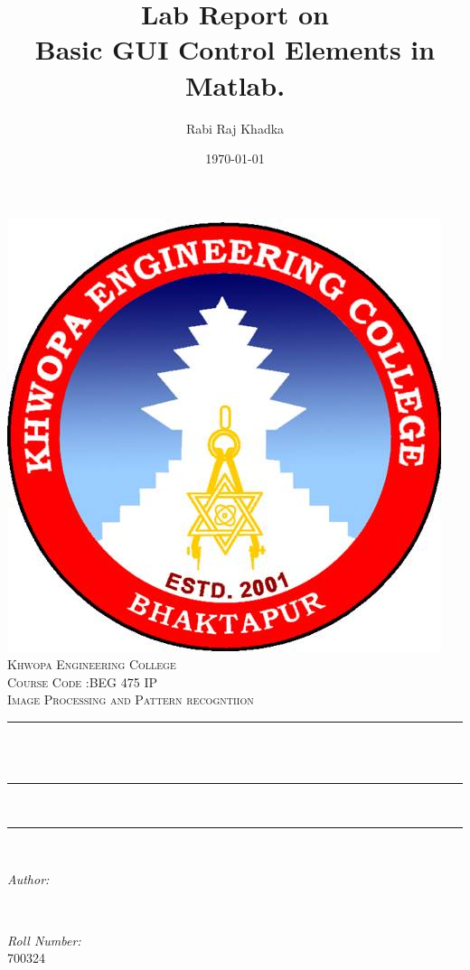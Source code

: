 \documentclass[12pt]{article}
\title{Lab Report on \\ Basic GUI Control Elements in Matlab.}								%
\author{Rabi Raj Khadka}								%
\date{\today}											%
\makeatletter
\let\thetitle\@title
\let\theauthor\@author
\let\thedate\@date
\makeatother
\begin{document}

\begin{titlepage}
	\centering
    \includegraphics[scale = 0.3]{kheclogo.jpg}\\[1.0 cm]	%
    \textsc{\LARGE Khwopa Engineering College}\\[1.5 cm]	%
	\textsc{\Large Course Code :BEG 475 IP}\\[0.5 cm]				%
	\textsc{\large Image Processing and Pattern recogntiion}\\[0.5 cm]				%
	\rule{\linewidth}{0.2 mm} \\[0.4 cm]
	{ \huge \bfseries \thetitle}\\
	\rule{\linewidth}{0.2 mm} \\[1.0 cm]
	
	
	\rule{\linewidth}{0 mm} \\[1.0 cm]

	\begin{minipage}{0.4\textwidth}
		\begin{flushleft} \large
			\emph{Author:}\\
			\theauthor
			\end{flushleft}
			\end{minipage}~
			\begin{minipage}{0.4\textwidth}
			\begin{flushright} \large
			\emph{Roll  Number:} \\
			700324									%
		\end{flushright}
	\end{minipage}\\[2cm]
	
	{\large \thedate}\\[2 cm]
 
	\vfill
	
\end{titlepage}
\end{document}
